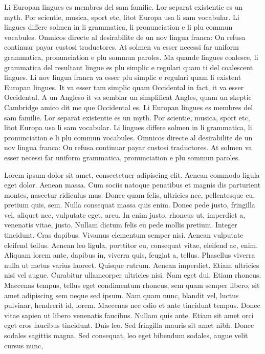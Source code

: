 Li Europan lingues es membres del sam familie. Lor separat existentie es un 
myth. Por scientie, musica, sport etc, litot Europa usa li sam vocabular. Li 
lingues differe solmen in li grammatica, li pronunciation e li plu commun 
vocabules. Omnicos directe al desirabilite de un nov lingua franca: On refusa 
continuar payar custosi traductores. At solmen va esser necessi far uniform 
grammatica, pronunciation e plu sommun paroles. Ma quande lingues coalesce, li 
grammatica del resultant lingue es plu simplic e regulari quam ti del coalescent 
lingues. Li nov lingua franca va esser plu simplic e regulari quam li existent 
Europan lingues. It va esser tam simplic quam Occidental in fact, it va esser 
Occidental. A un Angleso it va semblar un simplificat Angles, quam un skeptic 
Cambridge amico dit me que Occidental es. Li Europan lingues es membres del sam 
familie. Lor separat existentie es un myth. Por scientie, musica, sport etc, 
litot Europa usa li sam vocabular. Li lingues differe solmen in li grammatica, 
li pronunciation e li plu commun vocabules. Omnicos directe al desirabilite de 
un nov lingua franca: On refusa continuar payar custosi traductores. At solmen 
va esser necessi far uniform grammatica, pronunciation e plu sommun paroles. 

Lorem ipsum dolor sit amet, consectetuer adipiscing elit. Aenean commodo ligula 
eget dolor. Aenean massa. Cum sociis natoque penatibus et magnis dis parturient 
montes, nascetur ridiculus mus. Donec quam felis, ultricies nec, pellentesque 
eu, pretium quis, sem. Nulla consequat massa quis enim. Donec pede justo, 
fringilla vel, aliquet nec, vulputate eget, arcu. In enim justo, rhoncus ut, 
imperdiet a, venenatis vitae, justo. Nullam dictum felis eu pede mollis pretium. 
Integer tincidunt. Cras dapibus. Vivamus elementum semper nisi. Aenean vulputate 
eleifend tellus. Aenean leo ligula, porttitor eu, consequat vitae, eleifend ac, 
enim. Aliquam lorem ante, dapibus in, viverra quis, feugiat a, tellus. Phasellus 
viverra nulla ut metus varius laoreet. Quisque rutrum. Aenean imperdiet. Etiam 
ultricies nisi vel augue. Curabitur ullamcorper ultricies nisi. Nam eget dui. 
Etiam rhoncus. Maecenas tempus, tellus eget condimentum rhoncus, sem quam semper 
libero, sit amet adipiscing sem neque sed ipsum. Nam quam nunc, blandit vel, 
luctus pulvinar, hendrerit id, lorem. Maecenas nec odio et ante tincidunt 
tempus. Donec vitae sapien ut libero venenatis faucibus. Nullam quis ante. Etiam 
sit amet orci eget eros faucibus tincidunt. Duis leo. Sed fringilla mauris sit 
amet nibh. Donec sodales sagittis magna. Sed consequat, leo eget bibendum 
sodales, augue velit cursus nunc, 

